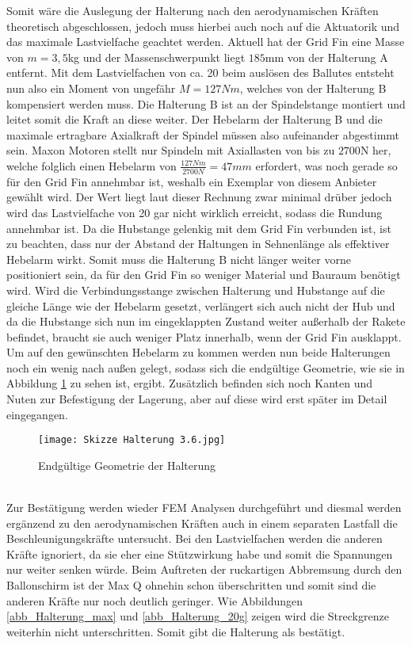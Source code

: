 Somit wäre die Auslegung der Halterung nach den aerodynamischen Kräften theoretisch abgeschlossen, jedoch muss hierbei auch noch auf die Aktuatorik und das maximale Lastvielfache geachtet werden. Aktuell hat der Grid Fin eine Masse von $m = 3,5$kg und der Massenschwerpunkt liegt $185$mm von der Halterung A entfernt. Mit dem Lastvielfachen von ca. 20 beim auslösen des Ballutes entsteht nun also ein Moment von ungefähr $M=127Nm$, welches von der Halterung B kompensiert werden muss. Die Halterung B ist an der Spindelstange montiert und leitet somit die Kraft an diese weiter. Der Hebelarm der Halterung B und die maximale ertragbare Axialkraft der Spindel müssen also aufeinander abgestimmt sein. Maxon Motoren stellt nur Spindeln mit Axiallasten von bis zu $2700$N her, welche folglich einen Hebelarm von $\frac{127Nm}{2700N}=47mm$ erfordert, was noch gerade so für den Grid Fin annehmbar ist, weshalb ein Exemplar von diesem Anbieter gewählt wird. Der Wert liegt laut dieser Rechnung zwar minimal drüber jedoch wird das Lastvielfache von 20 gar nicht wirklich erreicht, sodass die Rundung annehmbar ist. Da die Hubstange gelenkig mit dem Grid Fin verbunden ist, ist zu beachten, dass nur der Abstand der Haltungen in Sehnenlänge als effektiver Hebelarm wirkt. Somit muss die Halterung B nicht länger weiter vorne positioniert sein, da für den Grid Fin so weniger Material und Bauraum benötigt wird. Wird die Verbindungsstange zwischen Halterung und Hubstange auf die gleiche Länge wie der Hebelarm gesetzt, verlängert sich auch nicht der Hub und da die Hubstange sich nun im eingeklappten Zustand weiter außerhalb der Rakete befindet, braucht sie auch weniger Platz innerhalb, wenn der Grid Fin ausklappt. Um auf den gewünschten Hebelarm zu kommen werden nun beide Halterungen noch ein wenig nach außen gelegt, sodass sich die endgültige Geometrie, wie sie in Abbildung \ref{abb_Halterung-fertig} zu sehen ist, ergibt. Zusätzlich befinden sich noch Kanten und Nuten zur Befestigung der Lagerung, aber auf diese wird erst später im Detail eingegangen.
\begin{figure}[h] 
	\centering
	\texttt{[image: Skizze Halterung 3.6.jpg]}
	\caption{Endgültige Geometrie der Halterung}
	\label{abb_Halterung-fertig}
\end{figure}\\
Zur Bestätigung werden wieder FEM Analysen durchgeführt und diesmal werden ergänzend zu den aerodynamischen Kräften auch in einem separaten Lastfall die Beschleunigungskräfte untersucht. Bei den Lastvielfachen werden die anderen Kräfte ignoriert, da sie eher eine Stützwirkung habe und somit die Spannungen nur weiter senken würde. Beim Auftreten der ruckartigen Abbremsung durch den Ballonschirm ist der Max Q ohnehin schon überschritten und somit sind die anderen Kräfte nur noch deutlich geringer. Wie Abbildungen \ref{abb_Halterung_max} und \ref{abb_Halterung_20g} zeigen wird die Streckgrenze weiterhin nicht unterschritten. Somit gibt die Halterung als bestätigt.
